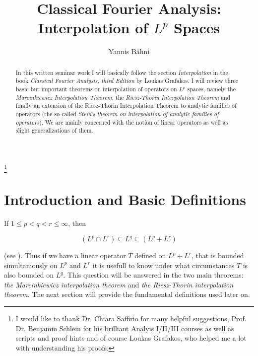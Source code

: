 

\begin{abstract}
	In this written seminar work I will basically follow the section \emph{Interpolation} in the book \emph{Classical Fourier Analysis, third Edition} by Loukas Grafakos. I will review three basic but important theorems on interpolation of operators on $L^p$ spaces, namely the \emph{Marcinkiewicz Interpolation Theorem}, the \emph{Riesz-Thorin Interpolation Theorem} and finally an extension of the Riesz-Thorin Interpolation Theorem to analytic families of operators (the so-called \emph{Stein's theorem on interpolation of analytic families of operators}). We are mainly concerned with the notion of linear operators as well as slight generalizations of them. 
\end{abstract}

\title{Classical Fourier Analysis: Interpolation of $L^p$ Spaces}
\author{Yannis B\"{a}hni}
\address[Yannis B\"{a}hni]{University of Zurich, R\"{a}mistrasse 71, 8006 Zurich}
\thanks{I would like to thank Dr. Chiara Saffirio for many helpful suggestions, Prof. Dr. Benjamin Schlein for his brilliant Analyis I/II/III courses as well as scripts and proof hints and of course Loukas Grafakos, who helped me a lot with understanding his proofs.}
\maketitle

\tableofcontents
\newpage

\mainsectionstyle

\section{Introduction and Basic Definitions}
If $1 \leqslant p < q < r \leqslant \infty$, then 

\begin{equation*}
	\left( L^p \cap L^r \right) \subseteq L^q \subseteq \left( L^p + L^r \right)
\end{equation*}

(see \cite[185]{folland:real_analysis:1999}). Thus if we have a linear operator $T$ defined on $L^p + L^r$, that is bounded simultaniously on $L^p$ and $L^r$ it is usefull to know under what circumstances $T$ is also bounded on $L^q$. This question will be answered in the two main theorems: \emph{the Marcinkiewicz interpolation theorem} and \emph{the Riesz-Thorin interpolation theorem}. The next section will provide the fundamental definitions used later on.

